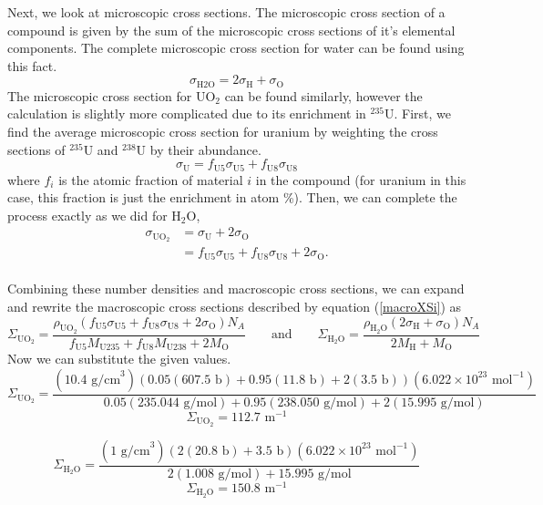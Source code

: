 \documentclass{report}
\begin{document}
\begin{enumerate}[a)]
Next, we look at microscopic cross sections. The microscopic cross section of a compound is given by the sum of the microscopic cross sections of it's elemental components. The complete microscopic cross section for water can be found using this fact.
$$ \sigma_{\text{H2O}} = 2\sigma_{\text{H}} + \sigma_{\text{O}} $$
The microscopic cross section for UO$_2$ can be found similarly, however the calculation is slightly more complicated due to its enrichment in $^{235}$U. First, we find the average microscopic cross section for uranium by weighting the cross sections of $^{235}$U and $^{238}$U by their abundance.
$$ \sigma_{\text{U}} = f_{\text{U}5} \sigma_{\text{U}5} + f_{\text{U}8} \sigma_{\text{U}8} $$
where $f_{i}$ is the atomic fraction of material $i$ in the compound (for uranium in this case, this fraction is just the enrichment in atom \%). Then, we can complete the process exactly as we did for H$_2$O,
\begin{align*}
\sigma_{\text{UO}_2}	&= \sigma_{\text{U}} + 2\sigma_{\text{O}} \\
						&= f_{\text{U}5} \sigma_{\text{U}5} + f_{\text{U}8} \sigma_{\text{U}8}  + 2\sigma_{\text{O}}. 
\end{align*}
\-\\

Combining these number densities and macroscopic cross sections, we can expand and rewrite the macroscopic cross sections described by equation (\ref{macroXSi}) as
$$ \Sigma_{\text{UO}_2} = \frac{\rho_{\text{UO}_2} \left( f_{\text{U}5} \sigma_{\text{U}5} + f_{\text{U}8} \sigma_{\text{U}8}  + 2\sigma_{\text{O}}\right) N_A}{f_{\text{U}5}M_{\text{U235}} + f_{\text{U}8}M_{\text{U238}} + 2M_{\text{O}}} \qquad\text{and}\qquad \Sigma_{\text{H}_2\text{O}} = \frac{\rho_{\text{H}_2\text{O}} \left(2\sigma_{\text{H}} + \sigma_{\text{O}}\right) N_A}{2M_{\text{H}} + M_\text{O}} $$
Now we can substitute the given values. 
$$ \Sigma_{\text{UO}_2} = \frac{\left(10.4\text{ g/cm}^3\right) \left(0.05(607.5\text{ b}) + 0.95(11.8\text{ b})  + 2(3.5\text{ b})\right)\left(6.022\times10^{23}\text{ mol}^{-1}\right)}{0.05(235.044\text{ g/mol}) + 0.95(238.050\text{ g/mol}) + 2(15.995\text{ g/mol})} $$
$$ \Sigma_{\text{UO}_2} = 112.7\text{ m}^{-1} $$

$$ \Sigma_{\text{H}_2\text{O}} = \frac{\left(1\text{ g/cm}^3\right) \left(2(20.8\text{ b}) + 3.5\text{ b}\right) \left(6.022\times10^{23}\text{ mol}^{-1}\right)}{2(1.008\text{ g/mol}) + 15.995\text{ g/mol}} $$
$$ \Sigma_{\text{H}_2\text{O}} = 150.8\text{ m}^{-1} $$


\end{enumerate}
\end{document}
